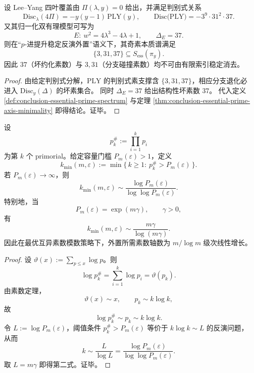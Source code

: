 \begin{corollary}\label{cor:conclusion-lee-yang-essential-odd-primes}
设 Lee--Yang 四叶覆盖由 \(\Pi(\lambda,y)=0\) 给出，并满足判别式关系
\[
\mathrm{Disc}_{\lambda}(4\Pi)=-y(y-1)\,\mathrm{PLY}(y),
\qquad
\mathrm{Disc}\bigl(\mathrm{PLY}\bigr)=-3^9\cdot 31^2\cdot 37.
\]
又其归一化双有理模型可写为
\[
E:\ w^2=4\lambda^3-4\lambda+1,
\qquad
\Delta_E=37.
\]
则在“\(p\)-进提升稳定反演外置”语义下，其奇素本质谱满足
\[
\{3,31,37\}\subseteq S_{\mathrm{ess}}(\pi_y).
\]
因此 \(37\)（坏约化素数）与 \(3,31\)（分支碰撞素数）均不可由有限索引稳定消去。
\end{corollary}
\begin{proof}
由给定判别式分解，\(\mathrm{PLY}\) 的判别式素支撑含 \(\{3,31,37\}\)，相应分支退化必进入
\(
\mathrm{Disc}_y(\Delta)
\)
的坏素集合。
同时 \(\Delta_E=37\) 给出结构性坏素数 \(37\)。
代入定义 \ref{def:conclusion-essential-prime-spectrum} 与定理 \ref{thm:conclusion-essential-prime-axis-minimality} 即得结论。证毕。
\end{proof}





\begin{proposition}\label{prop:conclusion-primorial-axis-dimension-law}
设
\[
p_k^\#:=\prod_{i=1}^{k}p_i
\]
为第 \(k\) 个 primorial。给定容量门槛 \(P_m(\varepsilon)>1\)，定义
\[
k_{\min}(m,\varepsilon):=
\min\{\,k\ge 1:\ p_k^\#>P_m(\varepsilon)\,\}.
\]
若 \(P_m(\varepsilon)\to\infty\)，则
\[
k_{\min}(m,\varepsilon)
\sim
\frac{\log P_m(\varepsilon)}{\log\log P_m(\varepsilon)}.
\]
特别地，当
\[
P_m(\varepsilon)=\exp(m\gamma),\qquad \gamma>0,
\]
有
\[
k_{\min}(m,\varepsilon)
\sim
\frac{m\gamma}{\log(m\gamma)}.
\]
因此在最优互异素数模数策略下，外置所需素数轴数为 \(m/\log m\) 级次线性增长。
\end{proposition}
\begin{proof}
设 \(\vartheta(x):=\sum_{p\le x}\log p\)。则
\[
\log p_k^\#
=\sum_{i=1}^{k}\log p_i
=\vartheta(p_k).
\]
由素数定理，
\[
\vartheta(x)\sim x,\qquad p_k\sim k\log k,
\]
故
\[
\log p_k^\#\sim p_k\sim k\log k.
\]
令 \(L:=\log P_m(\varepsilon)\)，阈值条件 \(p_k^\#>P_m(\varepsilon)\) 等价于 \(k\log k\sim L\) 的反演问题，从而
\[
k\sim \frac{L}{\log L}
=\frac{\log P_m(\varepsilon)}{\log\log P_m(\varepsilon)}.
\]
取 \(L=m\gamma\) 即得第二式。证毕。
\end{proof}

